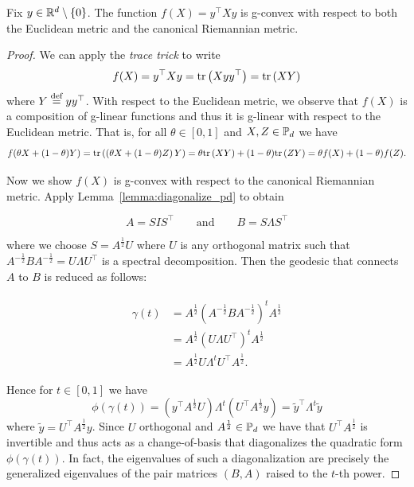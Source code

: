 \documentclass[twoside,11pt]{article}
\begin{document}
\begin{prop}\label{prop:quad_gcvx}
    Fix $y \in \mathbb{R}^d\setminus\{0\}$. The function $f(X) = y^\top X y$ is g-convex with respect to both the Euclidean metric and the canonical Riemannian metric.
\end{prop}
\begin{proof}
    We can apply the \textit{trace trick} to write
    \[
    f(X) = y^\top X y = \text{tr}\left(X y y^\top\right) = \text{tr}\left(X Y\right)
    \]
    where $Y \stackrel{\text{def}}{=} y y^\top$. With respect to the Euclidean metric, we observe that $f(X)$ is a composition of g-linear functions and thus it is g-linear with respect to the Euclidean metric. That is, for all $\theta \in [0,1]$ and $X,Z \in \mathbb{P}_d$ we have 
    \[
    f(\theta X + (1-\theta)Y) = \text{tr}\left( \left(\theta X + (1-\theta)Z\right)Y\right) = \theta \text{tr}\left(XY\right) + (1-\theta)\text{tr} \left(ZY\right) = \theta f(X) + (1-\theta) f(Z).
    \]

    Now we show $f(X)$ is g-convex with respect to the canonical Riemannian metric. Apply Lemma~\ref{lemma:diagonalize_pd} to obtain 

    \[
     A = S I S^\top \qquad \text{and} \qquad B = S \Lambda S^\top
    \]

    where we choose $S = A^{\frac{1}{2}} U$ where $U$ is any orthogonal matrix such that $A^{-\frac{1}{2}}B A^{-\frac{1}{2}} = U \Lambda U^\top$ is a spectral decomposition. Then the geodesic that connects $A$ to $B$ is reduced as follows:

    \begin{align*}
    \begin{split}
        \gamma(t)  &= A^{\frac{1}{2}}\left(A^{-\frac{1}{2}}B A^{-\frac{1}{2}}\right)^tA^{\frac{1}{2}}
        \\ &= A^{\frac{1}{2}} \left(U \Lambda U^\top \right)^t A^{\frac{1}{2}}
        \\ &= A^{\frac{1}{2}} U \Lambda^t U^\top A^{\frac{1}{2}}. 
    \end{split}
\end{align*}

Hence for $t \in [0,1]$ we have 
\begin{equation*}
    \phi(\gamma(t)) = \left( y^\top  A^{\frac{1}{2}} U  \right) \Lambda^t \left(U^\top A^{\frac{1}{2}}y \right) = \tilde{y}^\top \Lambda^t \tilde{y}
\end{equation*}
where $\tilde{y} = U^\top A^{\frac{1}{2}}y$. Since $U$ orthogonal and $A^{\frac{1}{2}} \in \mathbb{P}_d$ we have that $U^\top A^{\frac{1}{2}}$ is invertible and thus acts as a change-of-basis that diagonalizes the quadratic form $\phi(\gamma(t))$. In fact, the eigenvalues of such a diagonalization are precisely the generalized eigenvalues of the pair matrices $(B, A)$ raised to the $t$-th power.


\end{proof}
\end{document}
